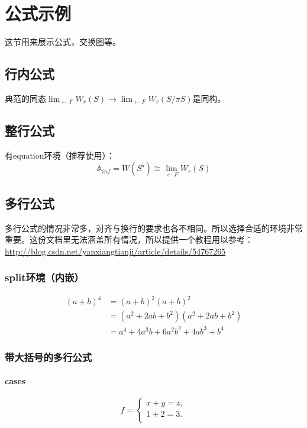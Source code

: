 \section{公式示例}

这节用来展示公式，交换图等。
 
\subsection{行内公式}
典范的同态$\lim_{\leftarrow F} W_r(S)\rightarrow \lim_{\leftarrow F} W_r(S/\pi S )$是同构。

\subsection{整行公式}
有equation环境（推荐使用）：
\begin{equation}
    \mathbb{A}_{inf}=W(S^\flat)\cong \lim_{\leftarrow F} W_r(S)
\end{equation}

\subsection{多行公式}
\begin{sloppypar}
多行公式的情况非常多，对齐与换行的要求也各不相同。所以选择合适的环境非常重要。这份文档里无法涵盖所有情况，所以提供一个教程用以参考：\url{http://blog.csdn.net/yanxiangtianji/article/details/54767265}
\end{sloppypar}

\subsubsection{split环境（内嵌）}
\begin{equation}
    \begin{split}
    (a + b)^4
      &= (a + b)^2 (a + b)^2      \\
      &= (a^2 + 2ab + b^2)
         (a^2 + 2ab + b^2)        \\
      &= a^4 + 4a^3b + 6a^2b^2 + 4ab^3 + b^4
    \end{split}
\end{equation}

\subsubsection{带大括号的多行公式}
\paragraph{cases}
\begin{equation}
    f=
    \begin{cases}
      x + y = z,  \\
      1 + 2 = 3.  \\
    \end{cases}
\end{equation}

